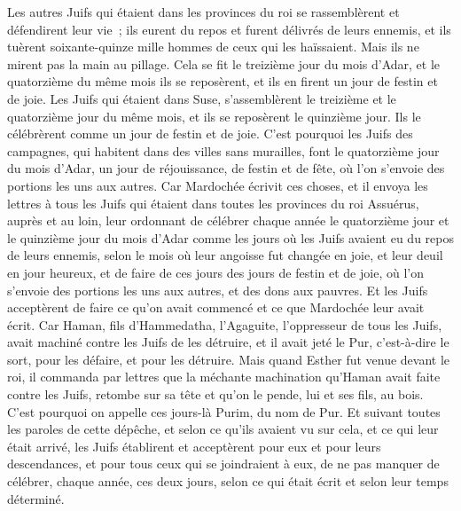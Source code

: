 \begin{multicols}{2}
Les autres Juifs qui étaient dans les provinces du roi se rassemblèrent et défendirent leur vie~; ils eurent du repos et furent délivrés de leurs ennemis, et ils tuèrent soixante-quinze mille hommes de ceux qui les haïssaient. Mais ils ne mirent pas la main au pillage.
Cela se fit le treizième jour du mois d'Adar, et le quatorzième du même mois ils se reposèrent, et ils en firent un jour de festin et de joie.
Les Juifs qui étaient dans Suse, s'assemblèrent le treizième et le quatorzième jour du même mois, et ils se reposèrent le quinzième jour. Ils le célébrèrent comme un jour de festin et de joie.
C'est pourquoi les Juifs des campagnes, qui habitent dans des villes sans murailles, font le quatorzième jour du mois d'Adar, un jour de réjouissance, de festin et de fête, où l'on s'envoie des portions les uns aux autres.
Car Mardochée écrivit ces choses, et il envoya les lettres à tous les Juifs qui étaient dans toutes les provinces du roi Assuérus, auprès et au loin,
leur ordonnant de célébrer chaque année le quatorzième jour et le quinzième jour du mois d'Adar
comme les jours où les Juifs avaient eu du repos de leurs ennemis, selon le mois où leur angoisse fut changée en joie, et leur deuil en jour heureux, et de faire de ces jours des jours de festin et de joie, où l'on s'envoie des portions les uns aux autres, et des dons aux pauvres.
Et les Juifs acceptèrent de faire ce qu'on avait commencé et ce que Mardochée leur avait écrit.
Car Haman, fils d'Hammedatha, l'Agaguite, l'oppresseur de tous les Juifs, avait machiné contre les Juifs de les détruire, et il avait jeté le Pur, c'est-à-dire le sort, pour les défaire, et pour les détruire.
Mais quand Esther fut venue devant le roi, il commanda par lettres que la méchante machination qu'Haman avait faite contre les Juifs, retombe sur sa tête et qu'on le pende, lui et ses fils, au bois.
C'est pourquoi on appelle ces jours-là Purim, du nom de Pur. Et suivant toutes les paroles de cette dépêche, et selon ce qu'ils avaient vu sur cela, et ce qui leur était arrivé,
les Juifs établirent et acceptèrent pour eux et pour leurs descendances, et pour tous ceux qui se joindraient à eux, de ne pas manquer de célébrer, chaque année, ces deux jours, selon ce qui était écrit et selon leur temps déterminé.

\end{multicols}
